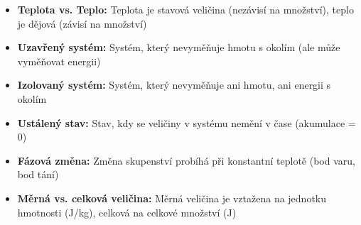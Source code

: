 \documentclass[11pt,a4paper]{article}
\begin{document}
\begin{itemize}
\item \textbf{Teplota vs. Teplo:} Teplota je stavová veličina (nezávisí na množství), teplo je dějová (závisí na množství)
\item \textbf{Uzavřený systém:} Systém, který nevyměňuje hmotu s okolím (ale může vyměňovat energii)
\item \textbf{Izolovaný systém:} Systém, který nevyměňuje ani hmotu, ani energii s okolím
\item \textbf{Ustálený stav:} Stav, kdy se veličiny v systému nemění v čase (akumulace = 0)
\item \textbf{Fázová změna:} Změna skupenství probíhá při konstantní teplotě (bod varu, bod tání)
\item \textbf{Měrná vs. celková veličina:} Měrná veličina je vztažena na jednotku hmotnosti (J/kg), celková na celkové množství (J)
\end{itemize}
\end{document}
